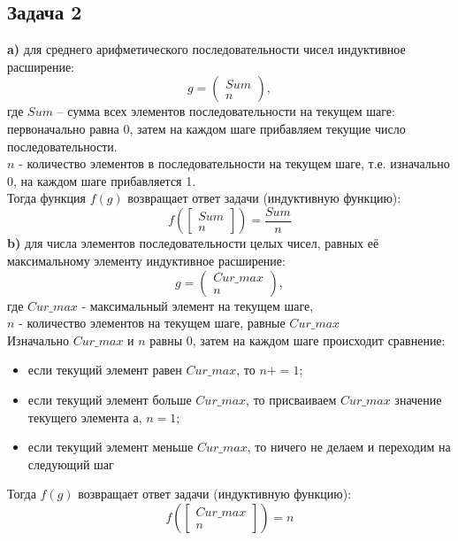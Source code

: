 \documentclass[a4paper,12pt]{article} %
\begin{document}
\subsection*{Задача 2}
\textbf{a)} для среднего арифметического последовательности чисел индуктивное расширение:
$$ g = \left(\begin{array}{c}{Sum} \\ {n}\end{array}\right), $$
где $Sum$ -- сумма всех элементов последовательности на текущем шаге: первоначально равна 0, затем на каждом шаге прибавляем текущие число последовательности.\\
$n$ - количество элементов в последовательности на текущем шаге, т.е. изначально 0, на каждом шаге прибавляется 1.\\
	Тогда функция $f(g)$ возвращает ответ задачи (индуктивную функцию):
$$f\left( \left[\begin{array}{c}{Sum} \\ {n}\end{array}\right]\right)=\frac{Sum}{n}$$
\textbf{b)} для числа элементов последовательности целых чисел, равных её максимальному элементу индуктивное расширение:
$$g = \left(\begin{array}{c}{Cur\_max} \\ {n}\end{array}\right),$$
где $ Cur\_max $ - максимальный элемент на текущем шаге,\\
$ n $ - количество элементов на текущем шаге, равные $ Cur\_max $\\

Изначально $ Cur\_max $ и $ n $ равны 0, затем на каждом шаге происходит сравнение:
\begin{itemize}
\item если текущий элемент равен $Cur\_max$, то $n += 1$;
\item если текущий элемент больше $Cur\_max$, то присваиваем $Cur\_max$ значение текущего элемента а, $n = 1$;
\item если текущий элемент меньше $Cur\_max$, то ничего не делаем и переходим на следующий шаг
\end{itemize}
Тогда $f(g)$ возвращает ответ задачи (индуктивную функцию):
$$f\left( \left[\begin{array}{c}{Cur\_max} \\ {n}\end{array}\right]\right)= n$$
\end{document}
